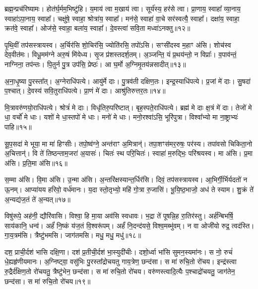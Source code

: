 ब्रह्म॒न्प्रच॑रिष्यामः। 
होत॑र्घ॒र्मम॒भिष्टु॑हि। 
य॒माय॑ त्वा म॒खाय॑ त्वा। 
सूर्य॑स्य॒ हर॑से त्वा। 
प्रा॒णाय॒ स्वाहा᳚ व्या॒नाय॒ स्वाहा॑ऽपा॒नाय॒ स्वाहा᳚। 
चक्षु॑षे॒ स्वाहा॒ श्रोत्रा॑य॒ स्वाहा᳚। 
मन॑से॒ स्वाहा॑ वा॒चे सर॑स्वत्यै॒ स्वाहा᳚। 
दक्षा॑य॒ स्वाहा॒ क्रत॑वे॒ स्वाहा᳚। 
ओज॑से॒ स्वाहा॒ बला॑य॒ स्वाहा᳚। 
दे॒वस्त्वा॑ सवि॒ता मध्वा॑ऽनक्तु॥१२॥

पृ॒थि॒वीं तप॑सस्त्रायस्व। 
अ॒र्चिर॑सि शो॒चिर॑सि॒ ज्योति॑रसि॒ तपो॑ऽसि। 
सꣳसी॑दस्व म॒हाꣳ अ॑सि। 
शोच॑स्व देव॒वीत॑मः। 
विधू॒मम॑ग्ने अरु॒षं मि॑येध्य। 
सृ॒ज प्र॑शस्तदर्\mbox{}श॒तम्। 
अ॒ञ्जन्ति॒ यं प्र॒थय॑न्तो॒ न विप्राः᳚। 
व॒पाव॑न्तं॒ नाग्निना॒ तप॑न्तः। 
पि॒तुर्न पु॒त्र उप॑सि॒ प्रेष्ठः॑। 
आ घ॒र्मो अ॒ग्निमृ॒तय॑न्नसादीत्॥१३॥

अ॒ना॒धृ॒ष्या पु॒रस्ता᳚त्। 
अ॒ग्नेराधि॑पत्ये। 
आयु॑र्मे दाः। 
पु॒त्रव॑ती दक्षिण॒तः। 
इन्द्र॒स्याधि॑पत्ये। 
प्र॒जां मे॑ दाः। 
सु॒षदा॑ प॒श्चात्। 
दे॒वस्य॑ सवि॒तुराधि॑पत्ये। 
प्रा॒णं मे॑ दाः। 
आश्रु॑तिरुत्तर॒तः॥१४॥

मि॒त्रावरु॑णयो॒राधि॑पत्ये। 
श्रोत्रं॑ मे दाः। 
विधृ॑तिरु॒परि॑ष्टात्। 
बृह॒स्पते॒राधि॑पत्ये। 
ब्रह्म॑ मे दाः क्ष॒त्रं मे॑ दाः। 
तेजो॑ मे धा॒ वर्चो॑ मे धाः। 
यशो॑ मे धा॒स्तपो॑ मे धाः। 
मनो॑ मे धाः। 
मनो॒रश्वा॑ऽसि॒ भूरि॑पुत्रा। 
विश्वा᳚भ्यो मा ना॒ष्ट्राभ्यः॑ पाहि॥१५॥

सू॒प॒सदा॑ मे भूया॒ मा मा॑ हिꣳसीः। 
तपो॒ष्व॑ग्ने॒ अन्त॑राꣳ अ॒मित्रान्॑। 
तपा॒शꣳस॑मर॒रुषः॒ पर॑स्य। 
तपा॑वसो चिकिता॒नो अ॒चित्तान्॑। 
वि ते॑ तिष्ठन्ताम॒जरा॑ अ॒यासः॑। 
चितः॑ स्थ परि॒चितः॑। 
स्वाहा॑ म॒रुद्भिः॒ परि॑श्रयस्व। 
मा अ॑सि। 
प्र॒मा अ॑सि। 
प्र॒ति॒मा अ॑सि॥१६॥

स॒म्मा अ॑सि। 
वि॒मा अ॑सि। 
उ॒न्मा अ॑सि। 
अ॒न्तरि॑क्षस्यान्त॒र्धि\-र॑सि। 
दिवं॒ तप॑सस्त्रायस्व। 
आ॒भिर्गी॒र्भिर्यदतो॑ न ऊ॒नम्। 
आप्या॑यय हरिवो॒ वर्ध॑मानः। 
य॒दा स्तो॒तृभ्यो॒ महि॑ गो॒त्रा रु॒जासि॑। 
भू॒यि॒ष्ठ॒भाजो॒ अध॑ ते स्याम। 
शु॒क्रं ते॑ अ॒न्यद्य॑ज॒तं ते॑ अ॒न्यत्॥१७॥

विषु॑रूपे॒ अह॑नी॒ द्यौरि॑वासि। 
विश्वा॒ हि मा॒या अव॑सि स्वधावः। 
भ॒द्रा ते॑ पूषन्नि॒ह रा॒तिर॑स्तु। 
अर्\mbox{}ह॑न्बिभर्\mbox{}षि॒ साय॑कानि॒ धन्व॑। 
अर्\mbox{}हं॑ नि॒ष्कं य॑ज॒तं  वि॒श्वरू॑पम्। 
अर्\mbox{}हं॑ नि॒दन्द॑यसे॒ विश्व॒मब्भु॑वम्। 
न वा ओजी॑यो रुद्र॒ त्वद॑स्ति। 
गा॒य॒त्रम॑सि। 
त्रैष्टु॑भमसि। 
जाग॑तमसि। 
मधु॒ मधु॒ मधु॑॥१८॥
\anuvakamend[अ॒न॒क्त्व॒सा॒दी॒दु॒त्त॒र॒तः पा॑हि प्रति॒मा अ॑सि यज॒तन्ते॑ अ॒न्यज्जाग॑तम॒स्येकं॑ च]

दश॒ प्राची॒र्दश॑ भासि दक्षि॒णा। 
दश॑ प्र॒तीची॒र्दश॑ भा॒स्युदी॑चीः। 
दशो॒र्ध्वा भा॑सि सुमन॒स्यमा॑नः। 
स नो॒ रुचं॑ धे॒ह्यहृ॑णीयमानः। 
अ॒ग्निष्ट्वा॒ वसु॑भिः पु॒रस्ता᳚द्रोचयतु गाय॒त्रेण॒ छन्द॑सा। 
स मा॑ रुचि॒तो रो॑चय। 
इन्द्र॑स्त्वा रु॒द्रैर्द॑क्षिण॒तो रो॑चयतु॒ त्रैष्टु॑भेन॒ छन्द॑सा। 
स मा॑ रुचि॒तो रो॑चय। 
वरु॑णस्त्वादि॒त्यैः प॒श्चाद्रो॑चयतु॒ जाग॑तेन॒ छन्द॑सा। 
स मा॑ रुचि॒तो रो॑चय॥१९॥

